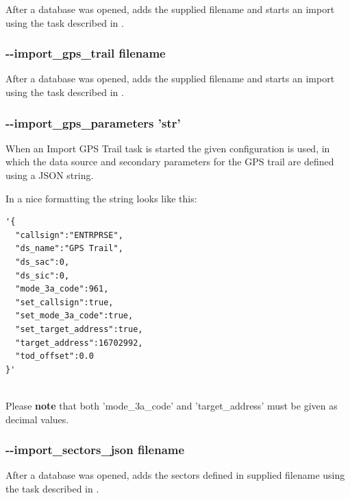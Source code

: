 After a database was opened, adds the supplied filename and starts an import using the task described in .

\subsubsection{-{}-import\_gps\_trail filename}

After a database was opened, adds the supplied filename and starts an import using the task described in .

\subsubsection{-{}-import\_gps\_parameters 'str'}

When an Import GPS Trail task is started the given configuration is used, in which the data source and secondary parameters for the GPS trail are defined using a JSON string.

In a nice formatting the string looks like this:
\begin{lstlisting}[basicstyle=\small\ttfamily]
'{
  "callsign":"ENTRPRSE",
  "ds_name":"GPS Trail",
  "ds_sac":0,
  "ds_sic":0,
  "mode_3a_code":961,
  "set_callsign":true,
  "set_mode_3a_code":true,
  "set_target_address":true,
  "target_address":16702992,
  "tod_offset":0.0
}'
\end{lstlisting}
\ \\

Please \textbf{note} that both 'mode\_3a\_code' and 'target\_address' must be given as decimal values.

% 
% 


\subsubsection{-{}-import\_sectors\_json  filename}

After a database was opened, adds the sectors defined in supplied filename using the task described in .

